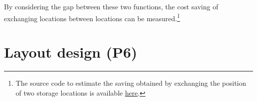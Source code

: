 By considering the gap between these two functions, the cost saving of exchanging locations between locations can be measured.\footnote{The source code to estimate the saving obtained by exchanging the position of two storage locations is available \href{https://github.com/aletuf93/logproj/blob/master/logproj/P6_placementProblem/warehouse_graph_definition.py}{here}.}

\section{Layout design (P6)}








